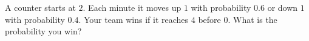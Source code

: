 A counter starts at $2$. Each minute it moves up $1$ with probability $0.6$ or down $1$ with probability $0.4$. Your team wins if it reaches $4$ before $0$. What is the probability you win?
